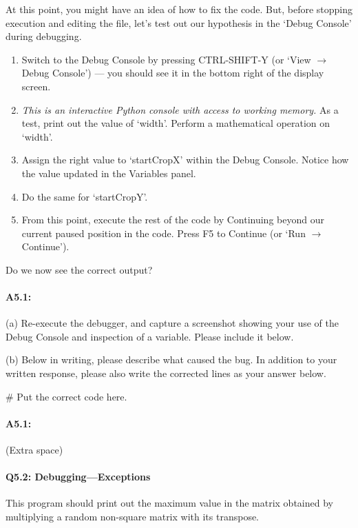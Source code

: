 \documentclass[11pt]{article}
\begin{document}
At this point, you might have an idea of how to fix the code. But, before stopping execution and editing the file, let's test out our hypothesis in the `Debug Console' during debugging.

\begin{enumerate}
    \item Switch to the Debug Console by pressing CTRL-SHIFT-Y (or `View $\rightarrow$ Debug Console') --- you should see it in the bottom right of the display screen.
    \item \emph{This is an interactive Python console with access to working memory.} As a test, print out the value of `width'. Perform a mathematical operation on `width'.
    \item Assign the right value to `startCropX' within the Debug Console. Notice how the value updated in the Variables panel.
    \item Do the same for `startCropY'.
    \item From this point, execute the rest of the code by Continuing beyond our current paused position in the code. Press F5 to Continue (or `Run $\rightarrow$ Continue').
\end{enumerate}

Do we now see the correct output?

\paragraph{A5.1: } (a) Re-execute the debugger, and capture a screenshot showing your use of the Debug Console and inspection of a variable. Please include it below.


(b) Below in writing, please describe what caused the bug. In addition to your written response, please also write the corrected lines as your answer below.
\begin{python}
# Put the correct code here.
\end{python}


\pagebreak
\paragraph{A5.1:}
(Extra space)

\pagebreak
\paragraph{Q5.2: Debugging---Exceptions} This program should print out the maximum value in the matrix obtained by multiplying a random non-square matrix with its transpose.
\end{document}
